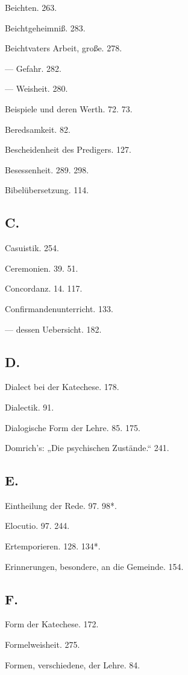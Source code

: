 Beichten. 263.

Beichtgeheimniß. 283.

Beichtvaters Arbeit, große. 278.

— Gefahr. 282.

— Weisheit. 280.

Beispiele und deren Werth. 72. 73.

Beredsamkeit. 82.

Bescheidenheit des Predigers. 127.

Besessenheit. 289. 298.

Bibelübersetzung. 114.

\subsection*{C.}

Casuistik. 254.

Ceremonien. 39. 51.

Concordanz. 14. 117.

Confirmandenunterricht. 133.

— dessen Uebersicht. 182.

\subsection*{D.}

Dialect bei der Katechese. 178.

Dialectik. 91.

Dialogische Form der Lehre. 85. 175.

Domrich's: „Die psychischen Zustände.“ 241.

\subsection*{E.}

Eintheilung der Rede. 97. 98*.

Elocutio. 97. 244.

Ertemporieren. 128. 134*.

Erinnerungen, besondere, an die Gemeinde. 154.

\subsection*{F.}

Form der Katechese. 172.

Formelweisheit. 275.

Formen, verschiedene, der Lehre. 84.

